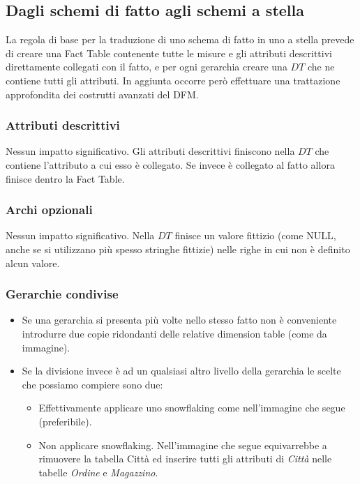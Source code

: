 \subsection{Dagli schemi di fatto agli schemi a stella}
La regola di base per la traduzione di uno schema di fatto in uno a stella prevede di creare una Fact Table contenente tutte le misure e gli attributi descrittivi direttamente collegati con il fatto, e per ogni gerarchia creare una $DT$ che ne contiene tutti gli attributi.\newline
In aggiunta occorre però effettuare una trattazione approfondita dei costrutti avanzati del DFM. 
\subsubsection{Attributi descrittivi}
Nessun impatto significativo. Gli attributi descrittivi finiscono nella $DT$ che contiene l'attributo a cui esso è collegato. Se invece è collegato al fatto allora finisce dentro la Fact Table.
\subsubsection{Archi opzionali}
Nessun impatto significativo. Nella $DT$ finisce un valore fittizio (come NULL, anche se si utilizzano più spesso stringhe fittizie) nelle righe in cui non è definito alcun valore.
\subsubsection{Gerarchie condivise}
\begin{itemize}
	\item Se una gerarchia si presenta più volte nello stesso fatto non è conveniente introdurre due copie ridondanti delle relative dimension table (come da immagine).
	\item Se la divisione invece è ad un qualsiasi altro livello della gerarchia le scelte che possiamo compiere sono due:
	\begin{itemize}
		\item Effettivamente applicare uno snowflaking come nell'immagine che segue (preferibile).
		\item Non applicare snowflaking. Nell'immagine che segue equivarrebbe a rimuovere la tabella Città ed inserire tutti gli attributi di \textit{Città} nelle tabelle \textit{Ordine} e \textit{Magazzino}.
	\end{itemize}
\end{itemize}

